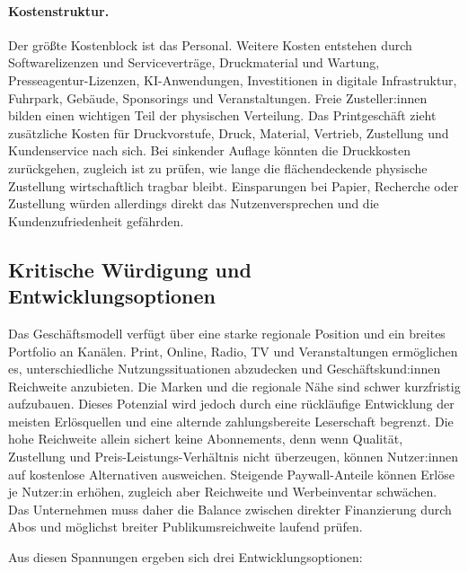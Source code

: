 \paragraph*{Kostenstruktur.}
Der größte Kostenblock ist das Personal. Weitere Kosten entstehen durch Softwarelizenzen und Serviceverträge, Druckmaterial und Wartung, Presseagentur-Lizenzen, KI-Anwendungen, Investitionen in digitale Infrastruktur, Fuhrpark, Gebäude, Sponsorings und Veranstaltungen. Freie Zusteller:innen bilden einen wichtigen Teil der physischen Verteilung. Das Printgeschäft zieht zusätzliche Kosten für Druckvorstufe, Druck, Material, Vertrieb, Zustellung und Kundenservice nach sich. Bei sinkender Auflage könnten die Druckkosten zurückgehen, zugleich ist zu prüfen, wie lange die flächendeckende physische Zustellung wirtschaftlich tragbar bleibt. Einsparungen bei Papier, Recherche oder Zustellung würden allerdings direkt das Nutzenversprechen und die Kundenzufriedenheit gefährden.

\subsection*{Kritische Würdigung und Entwicklungsoptionen}

Das Geschäftsmodell verfügt über eine starke regionale Position und ein breites Portfolio an Kanälen. Print, Online, Radio, TV und Veranstaltungen ermöglichen es, unterschiedliche Nutzungssituationen abzudecken und Geschäftskund:innen Reichweite anzubieten. Die Marken und die regionale Nähe sind schwer kurzfristig aufzubauen. Dieses Potenzial wird jedoch durch eine rückläufige Entwicklung der meisten Erlösquellen und eine alternde zahlungsbereite Leserschaft begrenzt. Die hohe Reichweite allein sichert keine Abonnements, denn wenn Qualität, Zustellung und Preis-Leistungs-Verhältnis nicht überzeugen, können Nutzer:innen auf kostenlose Alternativen ausweichen. Steigende Paywall-Anteile können Erlöse je Nutzer:in erhöhen, zugleich aber Reichweite und Werbeinventar schwächen. Das Unternehmen muss daher die Balance zwischen direkter Finanzierung durch Abos und möglichst breiter Publikumsreichweite laufend prüfen.

Aus diesen Spannungen ergeben sich drei Entwicklungsoptionen:

